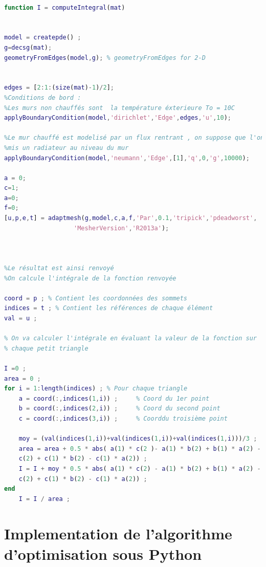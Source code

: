 \documentclass[a4paper,reqno]{article}
\begin{document}
\begin{lstlisting}[language=Matlab,frame=single,caption=Script Matlab pour le calcul de la valeur moyenne sur une géométrie donnée]

function I = computeIntegral(mat) 


model = createpde() ; 
g=decsg(mat);
geometryFromEdges(model,g); % geometryFromEdges for 2-D


edges = [2:1:(size(mat)-1)/2];
%Conditions de bord : 
%Les murs non chauffés sont  la température éxterieure To = 10C
applyBoundaryCondition(model,'dirichlet','Edge',edges,'u',10);

%Le mur chauffé est modelisé par un flux rentrant , on suppose que l'on a
%mis un radiateur au niveau du mur 
applyBoundaryCondition(model,'neumann','Edge',[1],'q',0,'g',10000);

a = 0;
c=1;
a=0;
f=0;
[u,p,e,t] = adaptmesh(g,model,c,a,f,'Par',0.1,'tripick','pdeadworst',
	               'MesherVersion','R2013a');



%Le résultat est ainsi renvoyé
%On calcule l'intégrale de la fonction renvoyée

coord = p ; % Contient les coordonnées des sommets 
indices = t ; % Contient les références de chaque élément
val = u ; 

% On va calculer l'intégrale en évaluant la valeur de la fonction sur
% chaque petit triangle 

I =0 ; 
area = 0 ; 
for i = 1:length(indices) ; % Pour chaque triangle 
    a = coord(:,indices(1,i)) ;     % Coord du 1er point 
    b = coord(:,indices(2,i)) ;     % Coord du second point 
    c = coord(:,indices(3,i)) ;     % Coorddu troisième point
    
    moy = (val(indices(1,i))+val(indices(1,i))+val(indices(1,i)))/3 ;
    area = area + 0.5 * abs( a(1) * c(2 )- a(1) * b(2) + b(1) * a(2) - b(1) * 
    c(2) + c(1) * b(2) - c(1) * a(2)) ; 
    I = I + moy * 0.5 * abs( a(1) * c(2) - a(1) * b(2) + b(1) * a(2) - b(1) * 
    c(2) + c(1) * b(2) - c(1) * a(2)) ;
end
    I = I / area ; 

\end{lstlisting}


\section*{Implementation de l'algorithme d'optimisation sous Python}
\end{document}
